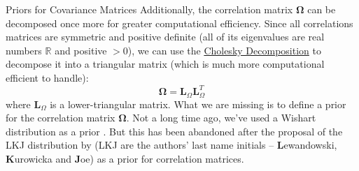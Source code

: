 \begin{frame}{Priors for Covariance Matrices}
	\small
	Additionally, the correlation matrix $\boldsymbol{\Omega}$
	can be decomposed once more for greater computational efficiency.
	Since all correlations matrices are symmetric and positive definite
	(all of its eigenvalues are real numbers $\mathbb{R}$ and positive $>0$),
	we can use the \href{https://en.wikipedia.org/wiki/Cholesky_decomposition}
	{Cholesky Decomposition}
	to decompose it into a triangular matrix
	(which is much more computational efficient to handle):
	$$
		\boldsymbol{\Omega} = \mathbf{L}_\Omega \mathbf{L}^T_\Omega
	$$
	where $\mathbf{L}_\Omega$ is a lower-triangular matrix.
	\vfill
	What we are missing is to define a prior for the correlation matrix $\boldsymbol{\Omega}$.
	Not a long time ago, we've used a Wishart distribution as a prior \parencite{gelman2013bayesian}.
	But this has been abandoned after the proposal of the LKJ distribution by \textcite{lewandowski2009generating}
	(LKJ are the authors' last name initials -- \textbf{L}ewandowski, \textbf{K}urowicka and \textbf{J}oe)
	as a prior for correlation matrices.
\end{frame}
